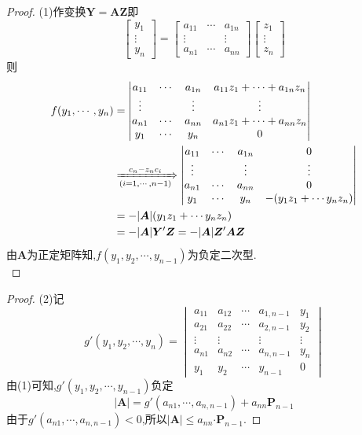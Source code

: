 \documentclass[lang=cn,11pt,normal]{elegantbook}
\renewcommand{\AA}{\boldsymbol{A}}
\newcommand{\YY}{\boldsymbol{Y}}
\newcommand{\PP}{\boldsymbol{P}}
\begin{document}
		\begin{proof}
		(1)作变换$\YY=\boldsymbol{AZ}$即
		\begin{equation}
		\begin{bmatrix}
		y_1\\\vdots\\y_n
		\end{bmatrix}
		=
		\begin{bmatrix}
		a_{11}&\cdots&a_{1n}\\
		\vdots&      &\vdots\\
		a_{n1}&\cdots&a_{nn}
		\end{bmatrix}
		\begin{bmatrix}
		z_1\\\vdots\\z_n
		\end{bmatrix}
		\end{equation}
		则
		\begin{equation}
		\begin{aligned}
		f(y_1,\cdots,y_n)&=
		\begin{vmatrix}
		a_{11}&\cdots&a_{1n}&a_{11}z_1+\cdots+a_{1n}z_n\\
		\vdots&&\vdots&\vdots\\
		a_{n1}&\cdots&a_{nn}&a_{n1}z_1+\cdots+a_{nn}z_n\\
		y_1&\cdots&y_n&0
		\end{vmatrix}\\
		&\xRightarrow[(i=1,\cdots,n-1)]{c_n-z_nc_i}
		\begin{vmatrix}
		a_{11}&\cdots&a_{1n}&0\\
		\vdots&&\vdots&\vdots\\
		a_{n1}&\cdots&a_{nn}&0\\
		y_1&\cdots&y_n&-(y_1z_1+\cdots y_nz_n)
		\end{vmatrix}\\
		&=-|\AA|(y_1z_1+\cdots y_nz_n)\\
		&=-|\AA|\YY'\boldsymbol{Z}=-|\AA|\boldsymbol{Z}'\boldsymbol{AZ}
		\end{aligned}
		\end{equation}
		由$\AA$为正定矩阵知,$f(y_1,y_2,\cdots,y_{n-1})$为负定二次型.\\
	\end{proof}
	\begin{proof}
		(2)记
		\begin{equation}
		g'(y_1,y_2,\cdots,y_n)=
		\begin{vmatrix}
		a_{11}&a_{12}&\cdots&a_{1,n-1}&y_1\\
		a_{21}&a_{22}&\cdots&a_{2,n-1}&y_2\\
		\vdots&\vdots&&\vdots&\vdots\\
		a_{n1}&a_{n2}&\cdots&a_{n,n-1}&y_n\\
		y_1&y_2&\cdots&y_{n-1}&0
		\end{vmatrix}
		\end{equation}
		由(1)可知,$g'(y_1,y_2,\cdots,y_{n-1})$负定
		\begin{equation}
		|\AA|=g'(a_{n1},\cdots,a_{n,n-1})+a_{nn}\PP_{n-1}
		\end{equation}
		由于$g'(a_{n1},\cdots,a_{n,n-1})<0$,所以$|\AA|\leq a_{nn}\boldsymbol{\cdot P}_{n-1}$.
	\end{proof}
\end{document}
